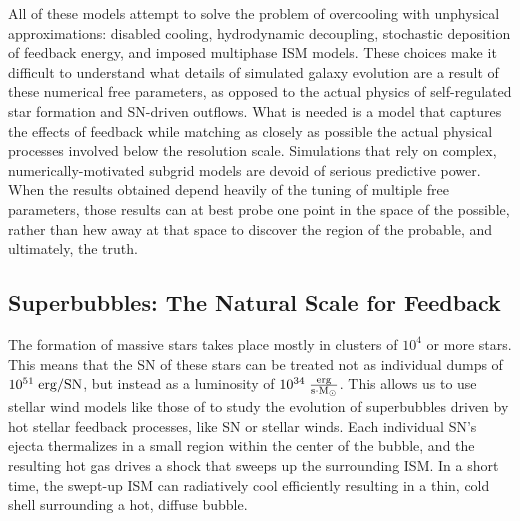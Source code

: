 All of these models attempt to solve the problem of overcooling with unphysical
approximations: disabled cooling, hydrodynamic decoupling, stochastic deposition
of feedback energy, and imposed multiphase ISM models.  These choices make it
difficult to understand what details of simulated galaxy evolution are a result
of these numerical free parameters, as opposed to the actual physics of
self-regulated star formation and SN-driven outflows.  What is needed is a model
that captures the effects of feedback while matching as closely as possible the
actual physical processes involved below the resolution scale.  Simulations that
rely on complex, numerically-motivated subgrid models are devoid of serious
predictive power.  When the results obtained depend heavily of the tuning of
multiple free parameters, those results can at best probe one point in the space
of the possible, rather than hew away at that space to discover the region of
the probable, and ultimately, the truth.  

\subsection{Superbubbles: The Natural Scale for Feedback}
The formation of massive stars takes place mostly in clusters of $10^4$ or more
stars.  This means that the SN of these stars can be treated not as individual
dumps of $10^{51}\;\rm{erg/SN}$, but instead as a luminosity of
$10^{34}\;\rm{\frac{erg}{s \cdot M_\odot}}$.  This allows us to use stellar wind
models like those of \citet{Weaver1977} to study the evolution of superbubbles driven by
hot stellar feedback processes, like SN or stellar winds.  Each individual SN's
ejecta thermalizes in a small region within the center of the bubble, and the
resulting hot gas drives a shock that sweeps up the surrounding ISM.  In a short
time, the swept-up ISM can radiatively cool efficiently resulting in a thin,
cold shell surrounding a hot, diffuse bubble.

